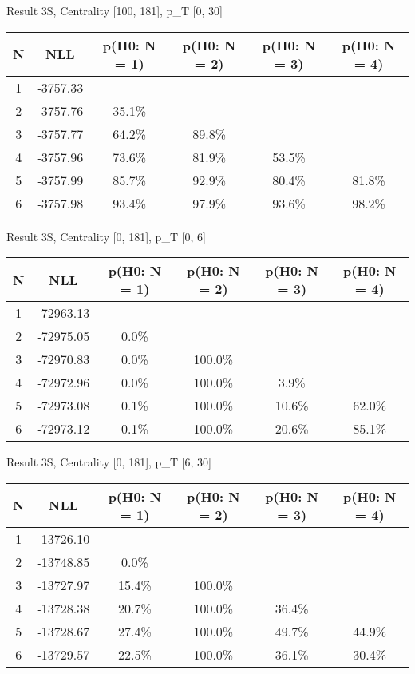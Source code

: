 Result 3S, Centrality [100, 181], p_{T} [0, 30]
\begin{table}[h!]
	\centering
	\begin{tabular}{cc||cccc}
		N & NLL & p(H0: N = 1) & p(H0: N = 2) & p(H0: N = 3) & p(H0: N = 4)\\ 
		\hline
1 & -3757.33 & & & & \\
2 & -3757.76 & 35.1\% & & & \\
3 & -3757.77 & 64.2\% & 89.8\% & & \\
4 & -3757.96 & 73.6\% & 81.9\% & 53.5\% & \\
5 & -3757.99 & 85.7\% & 92.9\% & 80.4\% & 81.8\% \\
6 & -3757.98 & 93.4\% & 97.9\% & 93.6\% & 98.2\% \\
	\end{tabular}
	\label{tab:lab}
\end{table}

Result 3S, Centrality [0, 181], p_{T} [0, 6]
\begin{table}[h!]
	\centering
	\begin{tabular}{cc||cccc}
		N & NLL & p(H0: N = 1) & p(H0: N = 2) & p(H0: N = 3) & p(H0: N = 4)\\ 
		\hline
1 & -72963.13 & & & & \\
2 & -72975.05 & 0.0\% & & & \\
3 & -72970.83 & 0.0\% & 100.0\% & & \\
4 & -72972.96 & 0.0\% & 100.0\% & 3.9\% & \\
5 & -72973.08 & 0.1\% & 100.0\% & 10.6\% & 62.0\% \\
6 & -72973.12 & 0.1\% & 100.0\% & 20.6\% & 85.1\% \\
	\end{tabular}
	\label{tab:lab}
\end{table}

Result 3S, Centrality [0, 181], p_{T} [6, 30]
\begin{table}[h!]
	\centering
	\begin{tabular}{cc||cccc}
		N & NLL & p(H0: N = 1) & p(H0: N = 2) & p(H0: N = 3) & p(H0: N = 4)\\ 
		\hline
1 & -13726.10 & & & & \\
2 & -13748.85 & 0.0\% & & & \\
3 & -13727.97 & 15.4\% & 100.0\% & & \\
4 & -13728.38 & 20.7\% & 100.0\% & 36.4\% & \\
5 & -13728.67 & 27.4\% & 100.0\% & 49.7\% & 44.9\% \\
6 & -13729.57 & 22.5\% & 100.0\% & 36.1\% & 30.4\% \\
	\end{tabular}
	\label{tab:lab}
\end{table}

